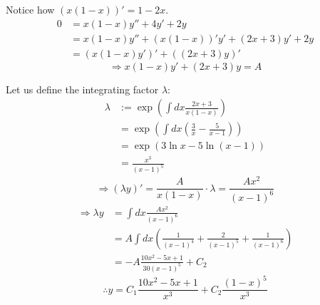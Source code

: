 \item

Notice how $(x(1 - x))' = 1 - 2x$.
\begin{align*}
	0
	&= x(1 - x) y'' + 4y' + 2y \\
	&= x(1 - x) y'' + (x(1 - x))' y' + (2x + 3) y' + 2y \\
	&= (x(1 - x)y')' + ((2x + 3)y)'
\end{align*}
\[
	\Rightarrow x(1 - x)y' + (2x + 3)y = A
\]

Let us define the integrating factor $\lambda$:
\begin{align*}
	\lambda
	&:= \exp \left( \int dx \frac{2x + 3}{x(1 - x)} \right) \\
	&= \exp \left( \int dx \left( \frac{3}{x} - \frac{5}{x - 1} \right) \right) \\
	&= \exp \left( 3 \ln x - 5 \ln (x - 1) \right) \\
	&= \frac{x^3}{{(x - 1)}^5}
\end{align*}
\[
	\Rightarrow (\lambda y)' = \frac{A}{x(1 - x)} \cdot \lambda = \frac{Ax^2}{{(x - 1)}^6}
\]
\begin{align*}
	\Rightarrow \lambda y
	&= \int dx \frac{Ax^2}{{(x - 1)}^6} \\
	&= A \int dx \left( \frac{1}{{(x - 1)}^4} + \frac{2}{{(x - 1)}^5} + \frac{1}{{(x - 1)}^6} \right) \\
	&= -A \frac{10x^2 - 5x + 1}{30 {(x - 1)}^5} + C_2
\end{align*}
\[
	\therefore y = C_1 \frac{10x^2 - 5x + 1}{x^3} + C_2 \frac{{(1 - x)}^5}{x^3}
\]
